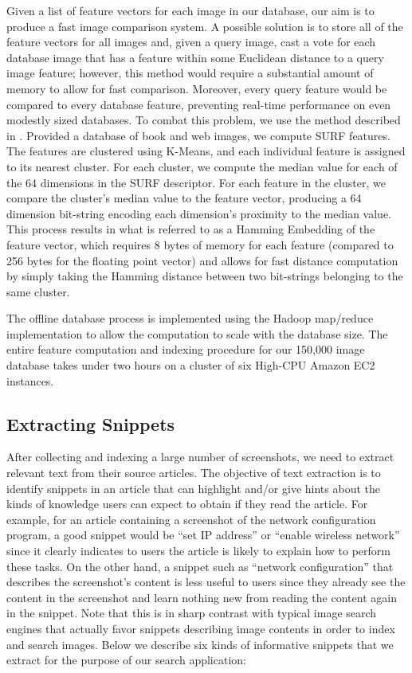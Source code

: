 \documentclass{www2010-submission}
\begin{document}
Given a list of feature vectors for each image in our database, our
aim is to produce a fast image comparison system.  A possible solution
is to store all of the feature vectors for all images and, given a
query image, cast a vote for each database image that has a feature
within some Euclidean distance to a query image feature; however, this
method would require a substantial amount of memory to allow
for fast comparison.  Moreover, every query feature would be compared
to every database feature, preventing real-time performance on even
modestly sized databases.  To combat this problem, we use the method
described in \cite{Schmid1478419}.  Provided a database of book and web
images, we compute SURF features. The features are clustered using
K-Means, and each individual feature is assigned to its nearest
cluster.  For each cluster, we compute the median value for each of
the 64 dimensions in the SURF descriptor.  For each feature in the
cluster, we compare the cluster's median value to the feature vector,
producing a 64 dimension bit-string encoding each dimension's
proximity to the median value.  This process results in what is
referred to as a Hamming Embedding of the feature vector, which
requires 8 bytes of memory for each feature (compared to 256 bytes for the floating point vector) and allows for fast
distance computation by simply taking the Hamming distance between two
bit-strings belonging to the same cluster.

The offline database process is implemented using the Hadoop map/reduce \cite{Ghemaqat1327492} implementation to allow the computation to scale with the database size.  The entire feature computation and indexing procedure for our 150,000 image database takes under two hours on a cluster of six High-CPU Amazon EC2 instances.
\subsection{Extracting Snippets}
\label{sec:extracting_snippets}

After collecting and indexing a large number of screenshots, we need
to extract relevant text from their source articles. The objective of text extraction is to identify snippets
in an article that can highlight and/or give hints about the kinds of
knowledge users can expect to obtain if they read the article. For
example, for an article containing a screenshot of the network
configuration program, a good snippet would be ``set IP address'' or
``enable wireless network'' since it clearly indicates to users the
article is likely to explain how to perform these tasks. On the other
hand, a snippet such as ``network configuration'' that describes the
screenshot's content is less useful to users since they already see
the content in the screenshot and learn nothing new from reading the
content again in the snippet. Note that this is in sharp contrast with
typical image search engines that actually favor snippets describing
image contents in order to index and search images. Below we describe
six kinds of informative snippets that we extract for the purpose of our 
search application:
\end{document}
